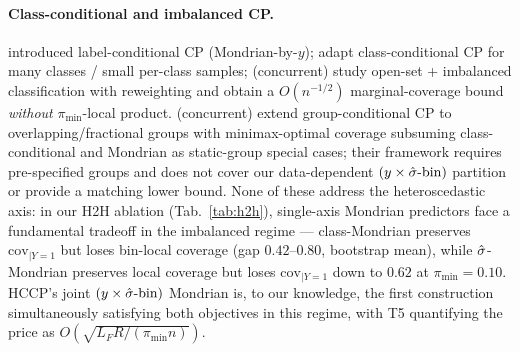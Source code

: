 \paragraph{Class-conditional and imbalanced CP.}
\citet{sadinle2019lac} introduced label-conditional CP (Mondrian-by-$y$); \citet{shi2024augmentedrank,ding2023classcond} adapt class-conditional CP for many classes / small per-class samples; \citet{xie2025imbalancedcp} (concurrent) study open-set + imbalanced classification with reweighting and obtain a $O(n^{-1/2})$ marginal-coverage bound \emph{without} $\pi_{\min}$-local product. \citet{bairaktari2025kandinsky} (concurrent) extend group-conditional CP to overlapping/fractional groups with minimax-optimal coverage subsuming class-conditional and Mondrian as static-group special cases; their framework requires pre-specified groups and does not cover our data-dependent $(y \times \hat{\sigma}\text{-bin})$ partition or provide a matching lower bound. None of these address the heteroscedastic axis: in our H2H ablation (Tab.~\ref{tab:h2h}), single-axis Mondrian predictors face a fundamental tradeoff in the imbalanced regime — class-Mondrian preserves $\mathrm{cov}_{|Y=1}$ but loses bin-local coverage (gap $0.42$--$0.80$, bootstrap mean), while $\hat{\sigma}$-Mondrian preserves local coverage but loses $\mathrm{cov}_{|Y=1}$ down to $0.62$ at $\pi_{\min} = 0.10$. HCCP's joint $(y \times \hat{\sigma}\text{-bin})$ Mondrian is, to our knowledge, the first construction simultaneously satisfying both objectives in this regime, with T5 quantifying the price as $O(\sqrt{L_F R / (\pi_{\min} n)})$.

